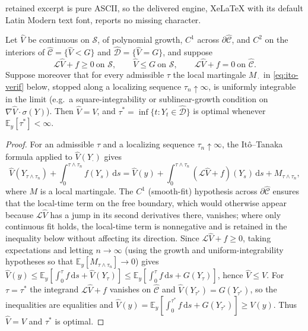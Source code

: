 \documentclass[10pt,a4paper]{amsart}
\newcommand{\E}{\mathbb{E}}
\newcommand{\Lgen}{\mathscr{L}}
\newcommand{\dd}{\,\mathrm{d}}
\begin{document}
retained excerpt is pure ASCII, so the delivered engine, XeLaTeX with its default Latin Modern text font, reports no missing character.
\begin{proposition}[Verification]\label{prop:verif}
Let $\widehat V$ be continuous on $\mathcal S$, of polynomial growth, $C^1$ across
$\partial\widehat{\mathcal C}$, and $C^2$ on the interiors of
$\widehat{\mathcal C}=\{\widehat V<G\}$ and $\widehat{\mathcal D}=\{\widehat V=G\}$,
and suppose
\[
  \Lgen\widehat V+f\ge0\ \text{on }\mathcal S,\qquad
  \widehat V\le G\ \text{on }\mathcal S,\qquad
  \Lgen\widehat V+f=0\ \text{on }\widehat{\mathcal C}.
\]
Suppose moreover that for every admissible $\tau$ the local martingale
$M_{\,\cdot\,}$ in \eqref{eq:ito-verif} below, stopped along a localizing sequence
$\tau_n\uparrow\infty$, is uniformly integrable in the limit (e.g.\ a
square-integrability or sublinear-growth condition on
$\nabla\widehat V\cdot\sigma(Y)$). Then $\widehat V=V$, and
$\tau^\ast=\inf\{t:Y_t\in\widehat{\mathcal D}\}$ is optimal whenever
$\E_y[\tau^\ast]<\infty$.
\end{proposition}

\begin{proof}
For an admissible $\tau$ and a localizing sequence $\tau_n\uparrow\infty$, the
It\^o--Tanaka formula applied to $\widehat V(Y_{\cdot})$ gives
\begin{equation}\label{eq:ito-verif}
  \widehat V(Y_{\tau\wedge\tau_n})+\int_0^{\tau\wedge\tau_n} f(Y_s)\dd s
   =\widehat V(y)+\int_0^{\tau\wedge\tau_n}(\Lgen\widehat V+f)(Y_s)\dd s
   +M_{\tau\wedge\tau_n},
\end{equation}
where $M$ is a local martingale. The $C^1$ (smooth-fit) hypothesis across
$\partial\widehat{\mathcal C}$ ensures that the local-time term on the free
boundary, which would otherwise appear because $\Lgen\widehat V$ has a jump in its
second derivatives there, vanishes; where only continuous fit holds, the
local-time term is nonnegative and is retained in the inequality below without
affecting its direction. Since $\Lgen\widehat V+f\ge0$, taking expectations and
letting $n\to\infty$ (using the growth and uniform-integrability hypotheses so
that $\E_y[M_{\tau\wedge\tau_n}]\to0$) gives
$\widehat V(y)\le\E_y[\int_0^\tau f\dd s+\widehat V(Y_\tau)]
\le\E_y[\int_0^\tau f\dd s+G(Y_\tau)]$, hence $\widehat V\le V$. For
$\tau=\tau^\ast$ the integrand $\Lgen\widehat V+f$ vanishes on
$\widehat{\mathcal C}$ and $\widehat V(Y_{\tau^\ast})=G(Y_{\tau^\ast})$, so the
inequalities are equalities and $\widehat V(y)=\E_y[\int_0^{\tau^\ast}f\dd
s+G(Y_{\tau^\ast})]\ge V(y)$. Thus $\widehat V=V$ and $\tau^\ast$ is optimal.
\end{proof}
\end{document}
